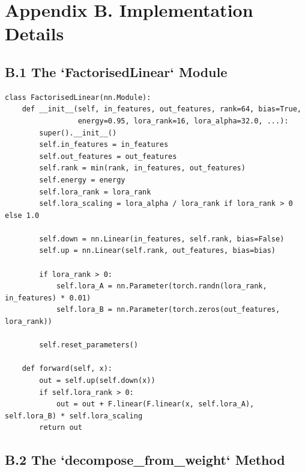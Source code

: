 
\section{Appendix B. Implementation Details}

\subsection{B.1 The `FactorisedLinear` Module}

\begin{lstlisting}
class FactorisedLinear(nn.Module):
    def __init__(self, in_features, out_features, rank=64, bias=True,
                 energy=0.95, lora_rank=16, lora_alpha=32.0, ...):
        super().__init__()
        self.in_features = in_features
        self.out_features = out_features
        self.rank = min(rank, in_features, out_features)
        self.energy = energy
        self.lora_rank = lora_rank
        self.lora_scaling = lora_alpha / lora_rank if lora_rank > 0 else 1.0
        
        self.down = nn.Linear(in_features, self.rank, bias=False)
        self.up = nn.Linear(self.rank, out_features, bias=bias)
        
        if lora_rank > 0:
            self.lora_A = nn.Parameter(torch.randn(lora_rank, in_features) * 0.01)
            self.lora_B = nn.Parameter(torch.zeros(out_features, lora_rank))
        
        self.reset_parameters()
    
    def forward(self, x):
        out = self.up(self.down(x))
        if self.lora_rank > 0:
            out = out + F.linear(F.linear(x, self.lora_A), self.lora_B) * self.lora_scaling
        return out
\end{lstlisting}

\subsection{B.2 The `decompose\_from\_weight` Method}

